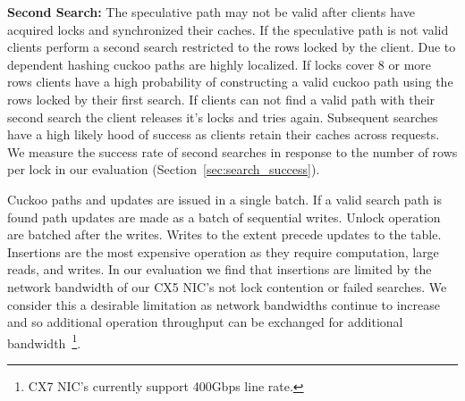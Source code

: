 \textbf{Second Search:} The speculative path may not be
valid after clients have acquired locks and synchronized
their caches. If the speculative path is not valid clients
perform a second search restricted to the rows locked by the
client. Due to dependent hashing cuckoo paths are highly
localized. If locks cover 8 or more rows clients have a high
probability of constructing a valid cuckoo path using the
rows locked by their first search. If clients can not find a
valid path with their second search the client releases it's
locks and tries again. Subsequent searches have a high
likely hood of success as clients retain their caches across
requests. We measure the success rate of second searches in
response to the number of rows per lock in our evaluation
(Section~\ref{sec:search_success}).

Cuckoo paths and updates are issued in a single batch. If a
valid search path is found path updates are made as a batch
of sequential writes. Unlock operation are batched after the
writes. Writes to the extent precede updates to the table.
Insertions are the most expensive operation as they require
computation, large reads, and writes. In our evaluation we
find that insertions are limited by the network bandwidth of
our CX5 NIC's not lock contention or failed searches. We
consider this a desirable limitation as network bandwidths
continue to increase and so additional operation throughput
can be exchanged for additional bandwidth~\footnote{CX7
NIC's currently support 400Gbps line rate.}.




